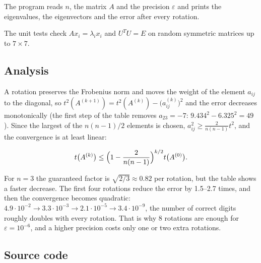 The program reads $n$, the matrix $A$ and the precision $\varepsilon$ and prints the eigenvalues,
the eigenvectors and the error after every rotation.




The unit tests check $A x_i = \lambda_i x_i$ and $U^T U = E$ on random symmetric matrices up to
$7 \times 7$.

\subsection{Analysis}

A rotation preserves the Frobenius norm and moves the weight of the element $a_{ij}$ to the
diagonal, so $t^2(A^{(k+1)}) = t^2(A^{(k)}) - \bigl(a_{ij}^{(k)}\bigr)^2$ and the error decreases
monotonically (the first step of the table removes $a_{23} = -7$: $9.434^2 - 6.325^2 = 49$).
Since the largest of the $n(n-1)/2$ elements is chosen, $a_{ij}^2 \ge \frac{2}{n(n-1)} t^2$, and
the convergence is at least linear:

\[
t\bigl(A^{(k)}\bigr) \le \Bigl(1 - \frac{2}{n(n-1)}\Bigr)^{k/2} t\bigl(A^{(0)}\bigr).
\]

For $n = 3$ the guaranteed factor is $\sqrt{2/3} \approx 0.82$ per rotation, but the table shows
a faster decrease. The first four rotations reduce the error by 1.5--2.7 times, and then the
convergence becomes quadratic:
$4.9 \cdot 10^{-2} \to 3.3 \cdot 10^{-3} \to 2.1 \cdot 10^{-5} \to 3.4 \cdot 10^{-9}$,
the number of correct digits roughly doubles with every rotation. That is why 8 rotations are
enough for $\varepsilon = 10^{-6}$, and a higher precision costs only one or two extra rotations.

\subsection{Source code}




\pagebreak
